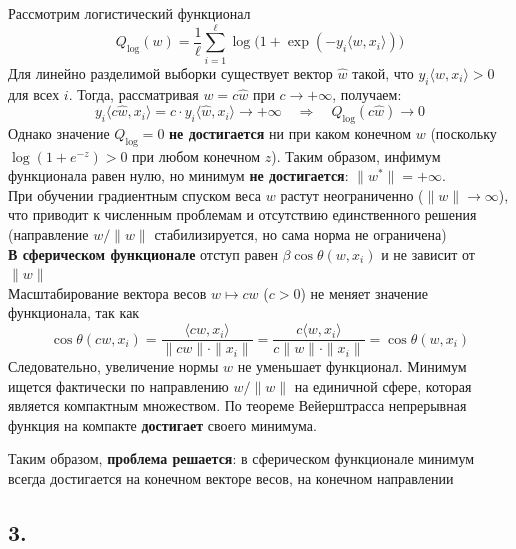 \documentclass[12pt,a4paper]{article}
\begin{document}
Рассмотрим логистический функционал
\[
Q_{\mathrm{log}}(w) = \frac{1}{\ell}\sum_{i=1}^{\ell}
\log\bigl(1 + \exp(-y_i\langle w, x_i\rangle)\bigr)
\]
Для линейно разделимой выборки существует вектор $\hat{w}$ такой, что
$y_i\langle \hat{w}, x_i\rangle > 0$ для всех $i$. Тогда, рассматривая
$w = c\hat{w}$ при $c\to +\infty$, получаем:
\[
y_i\langle c\hat{w}, x_i\rangle = c \cdot y_i\langle \hat{w}, x_i\rangle
\to +\infty \quad \Longrightarrow \quad
Q_{\mathrm{log}}(c\hat{w}) \to 0
\]
Однако значение $Q_{\mathrm{log}} = 0$ \textbf{не достигается} ни при
каком конечном $w$ (поскольку $\log(1+e^{-z}) > 0$ при любом конечном $z$). Таким образом, инфимум функционала равен нулю, но минимум
\textbf{не достигается}: $\|w^*\| = +\infty$.\\[1mm]
При обучении градиентным спуском веса $w$ растут неограниченно
($\|w\|\to\infty$), что приводит к численным проблемам и отсутствию
единственного решения (направление $w/\|w\|$ стабилизируется, но сама
норма не ограничена)\\[1mm]
\textbf{В сферическом функционале} отступ равен $\beta\cos\theta(w,x_i)$
и не зависит от $\|w\|$\\[1mm] Масштабирование вектора весов
$w \mapsto cw$ ($c > 0$) не меняет значение функционала, так как
\[
\cos\theta(cw, x_i) = \frac{\langle cw, x_i\rangle}{\|cw\|\cdot\|x_i\|}
= \frac{c\langle w, x_i\rangle}{c\|w\|\cdot\|x_i\|}
= \cos\theta(w, x_i)
\]
Следовательно, увеличение нормы $w$ не уменьшает функционал.
Минимум ищется фактически по направлению $w/\|w\|$ на единичной сфере,
которая является компактным множеством. По теореме Вейерштрасса
непрерывная функция на компакте \textbf{достигает} своего минимума.

Таким образом, \textbf{проблема решается}: в сферическом функционале
минимум всегда достигается на конечном векторе весов, на
конечном направлении\\[1mm]

\subsection*{3.}
\end{document}
